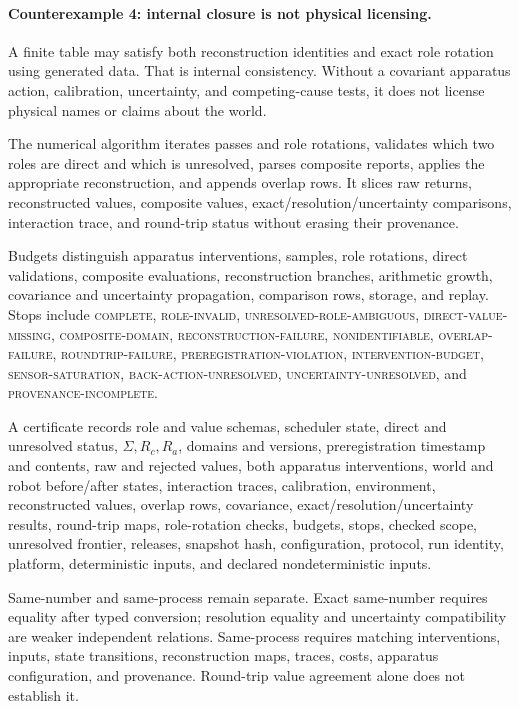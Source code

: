 \paragraph{Counterexample 4: internal closure is not physical licensing.}
A finite table may satisfy both reconstruction identities and exact role rotation using generated data.  That is
internal consistency.  Without a covariant apparatus action, calibration, uncertainty, and competing-cause tests, it
does not license physical names or claims about the world.

The numerical algorithm iterates passes and role rotations, validates which two roles are direct and which is
unresolved, parses composite reports, applies the appropriate reconstruction, and appends overlap rows.  It slices raw
returns, reconstructed values, composite values, exact/resolution/uncertainty comparisons, interaction trace, and
round-trip status without erasing their provenance.

Budgets distinguish apparatus interventions, samples, role rotations, direct validations, composite evaluations,
reconstruction branches, arithmetic growth, covariance and uncertainty propagation, comparison rows, storage, and
replay.  Stops include \textsc{complete}, \textsc{role-invalid}, \textsc{unresolved-role-ambiguous},
\textsc{direct-value-missing}, \textsc{composite-domain}, \textsc{reconstruction-failure},
\textsc{nonidentifiable}, \textsc{overlap-failure}, \textsc{roundtrip-failure},
\textsc{preregistration-violation}, \textsc{intervention-budget}, \textsc{sensor-saturation},
\textsc{back-action-unresolved}, \textsc{uncertainty-unresolved}, and \textsc{provenance-incomplete}.

A certificate records role and value schemas, scheduler state, direct and unresolved status, \(\Sigma,R_c,R_a\),
domains and versions, preregistration timestamp and contents, raw and rejected values, both apparatus interventions,
world and robot before/after states, interaction traces, calibration, environment, reconstructed values, overlap rows,
covariance, exact/resolution/uncertainty results, round-trip maps, role-rotation checks, budgets, stops, checked scope,
unresolved frontier, releases, snapshot hash, configuration, protocol, run identity, platform, deterministic inputs,
and declared nondeterministic inputs.

Same-number and same-process remain separate.  Exact same-number requires equality after typed conversion; resolution
equality and uncertainty compatibility are weaker independent relations.  Same-process requires matching
interventions, inputs, state transitions, reconstruction maps, traces, costs, apparatus configuration, and provenance.
Round-trip value agreement alone does not establish it.

